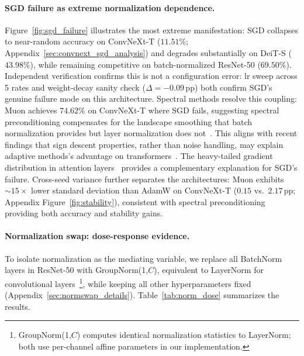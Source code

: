\paragraph{SGD failure as extreme normalization dependence.}
Figure~\ref{fig:sgd_failure} illustrates the most extreme manifestation: SGD collapses to near-random accuracy on ConvNeXt-T ($11.51\%$; Appendix~\ref{sec:convnext_sgd_analysis}) and degrades substantially on DeiT-S ($43.98\%$), while remaining competitive on batch-normalized ResNet-50 ($69.50\%$).
Independent verification confirms this is not a configuration error: lr sweep across 5 rates and weight-decay sanity check ($\Delta{=}{-}0.09$\,pp) both confirm SGD's genuine failure mode on this architecture.
Spectral methods resolve this coupling: Muon achieves $74.62\%$ on ConvNeXt-T where SGD fails, suggesting spectral preconditioning compensates for the landscape smoothing that batch normalization provides but layer normalization does not~\cite{santurkar2018how}.
This aligns with recent findings that sign descent properties, rather than noise handling, may explain adaptive methods's advantage on transformers~\citep{kunstner2024noise}.
The heavy-tailed gradient distribution in attention layers~\citep{zhang2020adaptive} provides a complementary explanation for SGD's failure.
Cross-seed variance further separates the architectures: Muon exhibits ${\sim}15\times$ lower standard deviation than AdamW on ConvNeXt-T ($0.15$ vs.\ $2.17$\,pp; Appendix Figure~\ref{fig:stability}), consistent with spectral preconditioning providing both accuracy and stability gains.

\paragraph{Normalization swap: dose-response evidence.}
\label{sec:norm_swap}
To isolate normalization as the mediating variable, we replace all BatchNorm layers in ResNet-50 with GroupNorm(1,$C$), equivalent to LayerNorm for convolutional layers~\cite{wu2018group,xiong2020layer}\footnote{GroupNorm(1,$C$) computes identical normalization statistics to LayerNorm; both use per-channel affine parameters in our implementation.}, while keeping all other hyperparameters fixed (Appendix~\ref{sec:normswap_details}).
Table~\ref{tab:norm_dose} summarizes the results.

